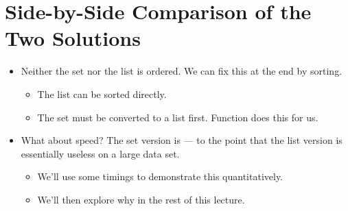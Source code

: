 \documentclass[letterpaper,10pt,english]{sphinxmanual}
\begin{document}
\section{Side-by-Side Comparison of the Two Solutions}
\label{\detokenize{lecture_notes/lec15_sets:side-by-side-comparison-of-the-two-solutions}}\begin{itemize}
\item {} 
Neither the set nor the list is ordered. We can fix this at the end by
sorting.
\begin{itemize}
\item {} 
The list can be sorted directly.

\item {} 
The set must be converted to a list first. Function 
does this for us.

\end{itemize}

\item {} 
What about speed? The set version is  — to the point
that the list version is essentially useless on a large data set.
\begin{itemize}
\item {} 
We’ll use some timings to demonstrate this quantitatively.

\item {} 
We’ll then explore why in the rest of this lecture.

\end{itemize}

\end{itemize}
\end{document}
